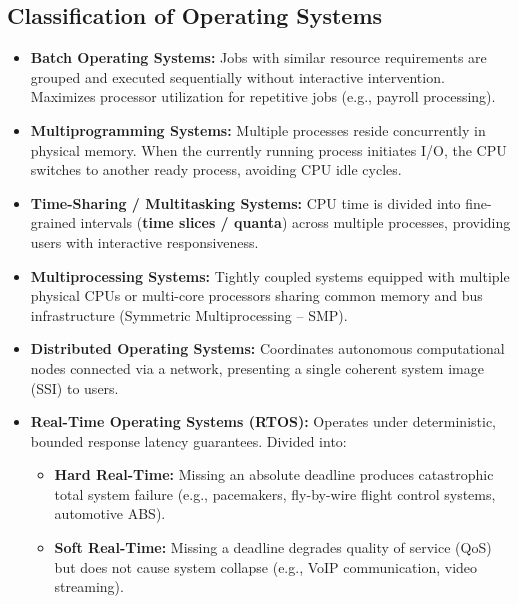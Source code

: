 \subsection{Classification of Operating Systems}
\begin{itemize}
    \item \textbf{Batch Operating Systems:} Jobs with similar resource requirements are grouped and executed sequentially without interactive intervention. Maximizes processor utilization for repetitive jobs (e.g., payroll processing).
    \item \textbf{Multiprogramming Systems:} Multiple processes reside concurrently in physical memory. When the currently running process initiates I/O, the CPU switches to another ready process, avoiding CPU idle cycles.
    \item \textbf{Time-Sharing / Multitasking Systems:} CPU time is divided into fine-grained intervals (\textbf{time slices / quanta}) across multiple processes, providing users with interactive responsiveness.
    \item \textbf{Multiprocessing Systems:} Tightly coupled systems equipped with multiple physical CPUs or multi-core processors sharing common memory and bus infrastructure (Symmetric Multiprocessing -- SMP).
    \item \textbf{Distributed Operating Systems:} Coordinates autonomous computational nodes connected via a network, presenting a single coherent system image (SSI) to users.
    \item \textbf{Real-Time Operating Systems (RTOS):} Operates under deterministic, bounded response latency guarantees. Divided into:
    \begin{itemize}
        \item \textbf{Hard Real-Time:} Missing an absolute deadline produces catastrophic total system failure (e.g., pacemakers, fly-by-wire flight control systems, automotive ABS).
        \item \textbf{Soft Real-Time:} Missing a deadline degrades quality of service (QoS) but does not cause system collapse (e.g., VoIP communication, video streaming).
    \end{itemize}
\end{itemize}

